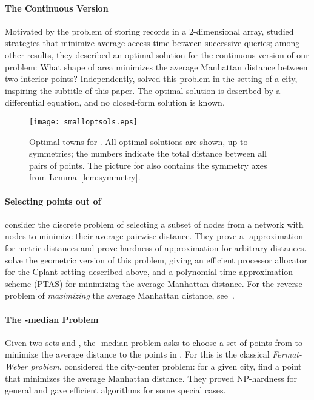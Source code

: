 \documentclass[preprint,authoryear,12pt]{elsarticle}
\begin{document}
\paragraph{The Continuous Version}
Motivated by the problem of storing records in a 2-dimensional
array, \cite{KarpMW75} studied strategies that minimize
average access time between successive queries; among other results,
they described an optimal solution for the continuous version of our
problem: What shape of area  minimizes the average Manhattan
distance between two interior points? Independently,
\cite{Bender03whatis} solved this problem in the setting of a city,
inspiring the subtitle of this paper. The optimal solution is
described by a differential equation, and no closed-form solution is
known.


\begin{figure}[tb]
\begin{center}
  \texttt{[image: smalloptsols.eps]}
  \caption{Optimal towns for .  All optimal solutions
    are shown, up to symmetries; the numbers indicate the total
    distance between all pairs of points. The picture for  also
    contains the symmetry axes from Lemma~\ref{lem:symmetry}. }
\label{fig:smalltowns}
\end{center}
\end{figure}

\paragraph{Selecting  points out of }
\cite{krumke97} consider the discrete problem of selecting a subset
of  nodes from a network with  nodes to minimize their average
pairwise distance. They prove a -approximation for metric
distances and prove hardness of approximation for arbitrary
distances.
\cite{bender08} solve the geometric version
of this problem, giving an efficient processor allocator for the Cplant setting
described above, and a polynomial-time approximation scheme (PTAS) for minimizing the
average Manhattan distance.
For the reverse problem of {\em maximizing} the
average Manhattan distance, see~\cite{fm-mdgmwc-04}.


\paragraph{The -median Problem}
Given two sets  and , the -median problem asks to choose a
set of  points from  to minimize the average distance to the
points in . For  this is the classical {\em Fermat-Weber
problem}.
\cite{Fekete00,fmb-cfwp-05} considered the city-center problem: for
a given city, find a point that minimizes the average Manhattan
distance.
They proved NP-hardness for general  and
gave efficient algorithms for some special cases.
\end{document}
